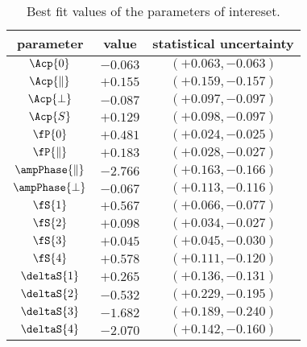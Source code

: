 \begin{table}[!h]
  \center
  \begin{tabular}{c c c}
    \hline
     parameter & value & statistical uncertainty \\
     \hline
     $             \Acp{0}$ & $-0.063$ & $(+0.063,-0.063)$ \\
     $     \Acp{\parallel}$ & $+0.155$ & $(+0.159,-0.157)$ \\
     $         \Acp{\perp}$ & $-0.087$ & $(+0.097,-0.097)$ \\
     $             \Acp{S}$ & $+0.129$ & $(+0.098,-0.097)$ \\
     \hline
     $              \fP{0}$ & $+0.481$ & $(+0.024,-0.025)$ \\
     $      \fP{\parallel}$ & $+0.183$ & $(+0.028,-0.027)$ \\
     $\ampPhase{\parallel}$ & $-2.766$ & $(+0.163,-0.166)$ \\
     $    \ampPhase{\perp}$ & $-0.067$ & $(+0.113,-0.116)$ \\
     \hline
     $              \fS{1}$ & $+0.567$ & $(+0.066,-0.077)$ \\
     $              \fS{2}$ & $+0.098$ & $(+0.034,-0.027)$ \\
     $              \fS{3}$ & $+0.045$ & $(+0.045,-0.030)$ \\
     $              \fS{4}$ & $+0.578$ & $(+0.111,-0.120)$ \\
     $          \deltaS{1}$ & $+0.265$ & $(+0.136,-0.131)$ \\
     $          \deltaS{2}$ & $-0.532$ & $(+0.229,-0.195)$ \\
     $          \deltaS{3}$ & $-1.682$ & $(+0.189,-0.240)$ \\
     $          \deltaS{4}$ & $-2.070$ & $(+0.142,-0.160)$ \\
    \hline
  \end{tabular}
  \caption{\small Best fit values of the parameters of intereset.}
  \label{bestFitResult}
\end{table}


